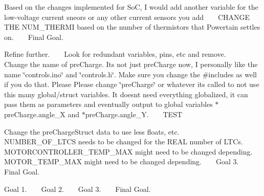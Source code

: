 \begin{DoxyRefList}
 Based on the changes implemented for SoC, I would add another variable for the low-\/voltage current sneors or any other current sensors you add ~\newline
 ~\newline
 CHANGE THE NUM\+\_\+\+THERMI based on the number of thermistors that Powertain settles on. ~\newline
 ~\newline
 Final Goal.  
\item[File \mbox{\hyperlink{_main_8ino}{Main.ino}} ]\label{todo__todo000008}%
%
 Refine further. ~\newline
 ~\newline
 Look for redundant variables, pins, etc and remove. ~\newline
 ~\newline
 Change the name of pre\+Charge. It\textquotesingle{}s not just pre\+Charge now, I personally like the name \char`\"{}controls.\+ino\char`\"{} and \char`\"{}controls.\+h\char`\"{}. Make sure you change the \#includes as well if you do that. Please Please change \char`\"{}pre\+Charge\char`\"{} or whatever it\textquotesingle{}s called to not use this many global/struct variables. It doesn\textquotesingle{}t need everything globalized, it can pass them as parameters and eventually output to global variables $\ast$pre\+Charge.angle\+\_\+X and $\ast$pre\+Charge.angle\+\_\+Y. ~\newline
 ~\newline
 TEST  
\item[File \mbox{\hyperlink{_precharge_8h}{Precharge.h}} ]\label{todo__todo000009}%
%
 Change the pre\+Charge\+Struct data to use less floats, etc. ~\newline
 ~\newline
 NUMBER\+\_\+\+OF\+\_\+\+LTCS needs to be changed for the REAL number of LTCs. MOTORCONTROLLER\+\_\+\+TEMP\+\_\+\+MAX might need to be changed depending. MOTOR\+\_\+\+TEMP\+\_\+\+MAX might need to be changed depending. ~\newline
 ~\newline
 Goal 3. ~\newline
 ~\newline
 Final Goal.  
\item[File \mbox{\hyperlink{_pre_charge_8ino}{Pre\+Charge.ino}} ]\label{todo__todo000010}%
%
 Goal 1. ~\newline
 ~\newline
 Goal 2. ~\newline
 ~\newline
 Goal 3. ~\newline
 ~\newline
 Final Goal. 
\end{DoxyRefList}